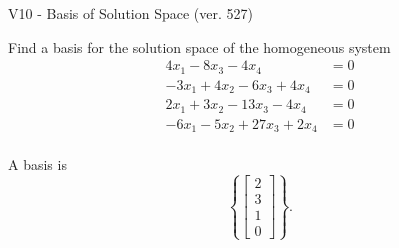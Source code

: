 \begin{exercise}
  \begin{exerciseTitle}V10 - Basis of Solution Space (ver. 527)\end{exerciseTitle}
  \begin{exerciseStatement}
    Find a basis for the solution space of the homogeneous system 
\begin{align*}
 4 x_ 1 -8 x_ 3 -4 x_ 4 &= 0  \\ 
  -3 x_ 1 + 4 x_ 2 -6 x_ 3 + 4 x_ 4 &= 0  \\ 
  2 x_ 1 + 3 x_ 2 -13 x_ 3 -4 x_ 4 &= 0  \\ 
  -6 x_ 1 -5 x_ 2 + 27 x_ 3 + 2 x_ 4 &= 0  \\ 
 \end{align*}


 
  \end{exerciseStatement}

  \begin{exerciseAnswer}
   A basis is   
\[\left\{\left[\begin{array}{c}
2 \\
3 \\
1 \\
0
\end{array}\right]\right\}.\]

  


  \end{exerciseAnswer}
\end{exercise}